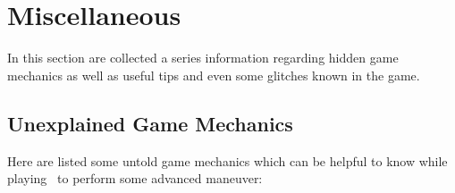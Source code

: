 \section{Miscellaneous}\label{X1:misc} %
In this section are collected a series information regarding hidden game mechanics as well as useful tips and even some glitches known in the game.

\subsection{Unexplained Game Mechanics}\label{X1:game_mechanics}
Here are listed some untold game mechanics which can be helpful to know while playing~\cite{RTA_wiki:X1} to perform some advanced maneuver: 
